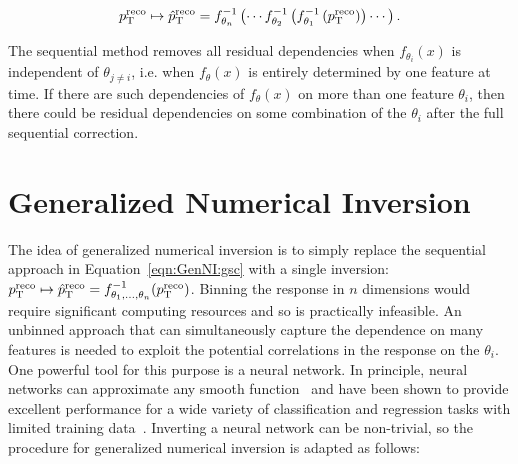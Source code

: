 \begin{align}
\label{eqn:GenNI:gsc}
p_\text{T}^\text{reco}\mapsto \hat{p}_\text{T}^\text{reco} = f_{\theta_{n}}^{-1}\left(\cdots f_{\theta_{2}}^{-1}\left(f_{\theta_{1}}^{-1}\left(p_\text{T}^\text{reco}\right)\right)\cdots\right).
\end{align}

The sequential method removes all residual dependencies when $f_{\theta_{i}}(x)$ is independent of $\theta_{j\neq i}$, i.e. when $f_{\theta}(x)$ is entirely determined by one feature at time.
If there are such dependencies of $f_{\theta}(x)$ on more than one feature $\theta_i$, then there could be residual dependencies on some combination of the $\theta_i$ after the full sequential correction.

\section{Generalized Numerical Inversion}
\label{sec:GenNI:genni}

The idea of generalized numerical inversion is to simply replace the sequential approach in Equation~\ref{eqn:GenNI:gsc} with a single inversion: $p_\text{T}^\text{reco}\mapsto \hat{p}_\text{T}^\text{reco} = f_{\theta_1,...,\theta_n}^{-1}(p_\text{T}^\text{reco})$.
Binning the response in $n$ dimensions would require significant computing resources and so is practically infeasible.
An unbinned approach that can simultaneously capture the dependence on many features is needed to exploit the potential correlations in the response on the $\theta_i$.
One powerful tool for this purpose is a neural network.
In principle, neural networks can approximate any smooth function~\cite{Rosenblatt58theperceptron,Cybenko1989,HORNIK1991251} and have been shown to provide excellent performance for a wide variety of classification and regression tasks with limited training data~\cite{haykin1994neural,Kriesel2007NeuralNetworks,bishop_2013,reed_marks_1999,goodfellow_bengio_courville_2017,ng2000cs229}.
Inverting a neural network can be non-trivial, so the procedure for generalized numerical inversion is adapted as follows:

